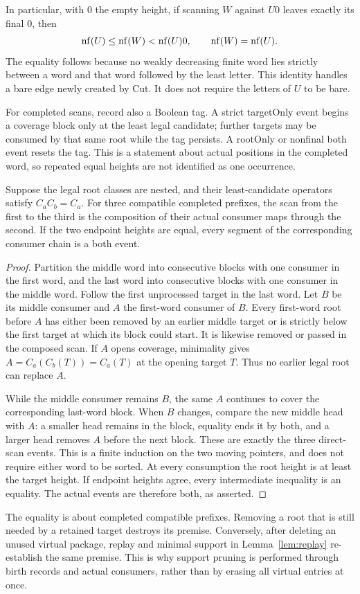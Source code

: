 In particular, with $0$ the empty height, if scanning $W$ against
$U0$ leaves exactly its final $0$, then
\begin{equation}\label{eq:2-1}
             \operatorname{nf}(U)\le\operatorname{nf}(W)<\operatorname{nf}(U)0,
             \qquad \operatorname{nf}(W)=\operatorname{nf}(U).                 
\end{equation}
The equality follows because no weakly decreasing finite word lies
strictly between a word and that word followed by the least letter.
This identity handles a bare edge newly created by Cut. It does not
require the letters of $U$ to be bare.

For completed scans, record also a Boolean tag. A strict targetOnly
event begins a coverage block only at the least legal candidate; further
targets may be consumed by that same root while the tag persists. A
rootOnly or nonfinal both event resets the tag. This is a statement about
actual positions in the completed word, so repeated equal heights are
not identified as one occurrence.

\begin{lemma}\label{lem:composition}
Suppose the legal root classes are nested, and their least-candidate
operators satisfy $C_aC_b=C_a$. For three compatible completed prefixes,
the scan from the first to the third is the composition of their actual
consumer maps through the second. If the two endpoint heights are equal,
every segment of the corresponding consumer chain is a both event.
\end{lemma}
\begin{proof}
Partition the middle word into consecutive blocks with one consumer in
the first word, and the last word into consecutive blocks with one
consumer in the middle word. Follow the first unprocessed target in
the last word. Let $B$ be its middle consumer and $A$ the first-word
consumer of $B$. Every first-word root before $A$ has either been removed
by an earlier middle target or is strictly below the first target at
which its block could start. It is likewise removed or passed in the
composed scan. If $A$ opens coverage, minimality gives
$A=C_a(C_b(T))=C_a(T)$ at the opening target $T$. Thus no earlier legal
root can replace $A$.

While the middle consumer remains $B$, the same $A$ continues to cover
the corresponding last-word block. When $B$ changes, compare the new
middle head with $A$: a smaller head remains in the block, equality
ends it by both, and a larger head removes $A$ before the next block.
These are exactly the three direct-scan events. This is a finite
induction on the two moving pointers, and does not require either word
to be sorted. At every consumption the root height is at least the
target height. If endpoint heights agree, every intermediate inequality
is an equality. The actual events are therefore both, as asserted.
\end{proof}

The equality is about completed compatible prefixes. Removing a root
that is still needed by a retained target destroys its premise.
Conversely, after deleting an unused virtual package, replay and minimal
support in Lemma~\ref{lem:replay} re-establish the same premise. This is
why support pruning is performed through birth records and actual
consumers, rather than by erasing all virtual entries at once.
